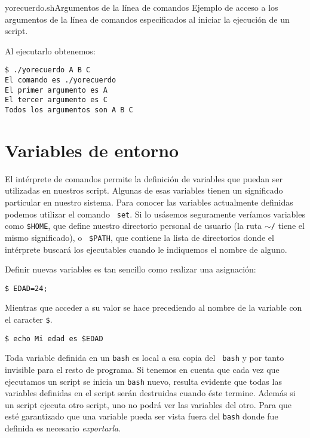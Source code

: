 \begin{ejemplo}{yorecuerdo.sh}{Argumentos de la línea de comandos}
Ejemplo de acceso a los argumentos de la línea de comandos especificados
al iniciar la ejecución de un script.
\end{ejemplo}

Al ejecutarlo obtenemos:

\begin{verbatim}
$ ./yorecuerdo A B C
El comando es ./yorecuerdo
El primer argumento es A
El tercer argumento es C
Todos los argumentos son A B C
\end{verbatim}
      

\section{Variables de entorno}

El  intérprete de  comandos  permite la  definición  de variables  que
puedan ser  utilizadas en nuestros  script. Algunas de  esas variables
tienen un significado particular en  nuestro sistema. Para conocer las
variables  actualmente  definidas  podemos utilizar  el  comando  {\tt
set}. Si  lo usásemos  seguramente veríamos  variables como
{\tt \$HOME},  que define  nuestro directorio  personal de
usuario (la  ruta {\tt  $\sim$/} tiene el  mismo significado),  o {\tt
\$PATH},  que contiene  la lista  de directorios  donde el
intérprete buscará los  ejecutables cuando le indiquemos  el nombre de
alguno.

Definir nuevas variables es tan sencillo como realizar una asignación:

\begin{verbatim}
$ EDAD=24;
\end{verbatim}

Mientras que  acceder a su valor  se hace precediendo al  nombre de la
variable con el caracter {\tt \$}.

\begin{verbatim} 
$ echo Mi edad es $EDAD 
\end{verbatim}

Toda variable definida en un {\tt bash}  es local a esa copia del {\tt
bash} y por  tanto invisible para el resto de  programa. Si tenemos en
cuenta que cada  vez que ejecutamos un script se  inicia un {\tt bash}
nuevo, resulta evidente que todas las variables definidas en el script
serán destruidas cuando éste termine. Además si un script ejecuta otro
script,  uno no  podrá  ver  las variables  del  otro.  Para que  esté
garantizado  que una  variable pueda  ser vista  fuera del  {\tt bash}
donde fue definida es necesario {\em exportarla}.

